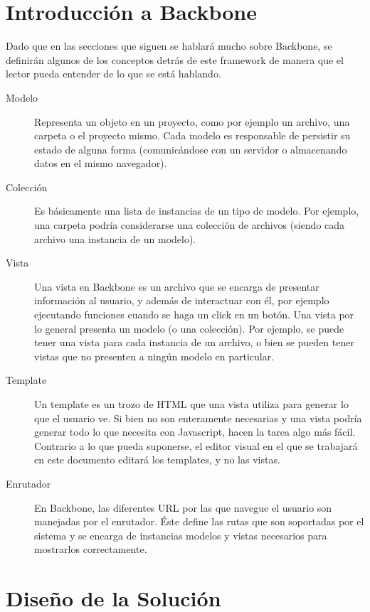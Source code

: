 \documentclass[12pt,spanish,letter]{report}
\begin{document}
\section{Introducción a Backbone}

\label{section:object-definition}

Dado que en las secciones que siguen se hablará mucho sobre Backbone, se
definirán algunos de los conceptos detrás de este framework de manera
que el lector pueda entender de lo que se está hablando.

\begin{description}
\item[Modelo]
Representa un objeto en un proyecto, como por ejemplo un archivo, una
carpeta o el proyecto mismo. Cada modelo es responsable de persistir su
estado de alguna forma (comunicándose con un servidor o almacenando
datos en el mismo navegador).
\item[Colección]
Es básicamente una lista de instancias de un tipo de modelo. Por
ejemplo, una carpeta podría considerarse una colección de archivos
(siendo cada archivo una instancia de un modelo).
\item[Vista]
Una vista en Backbone es un archivo que se encarga de presentar
información al usuario, y además de interactuar con él, por ejemplo
ejecutando funciones cuando se haga un click en un botón. Una vista por
lo general presenta un modelo (o una colección). Por ejemplo, se puede
tener una vista para cada instancia de un archivo, o bien se pueden
tener vistas que no presenten a ningún modelo en particular.
\item[Template]
Un template es un trozo de HTML que una vista utiliza para generar lo
que el usuario ve. Si bien no son enteramente necesarias y una vista
podría generar todo lo que necesita con Javascript, hacen la tarea algo
más fácil. Contrario a lo que pueda suponerse, el editor visual en el
que se trabajará en este documento editará los templates, y no las
vistas.
\item[Enrutador]
En Backbone, las diferentes URL por las que navegue el usuario son
manejadas por el enrutador. Éste define las rutas que son soportadas por
el sistema y se encarga de instancias modelos y vistas necesarios para
mostrarlos correctamente.
\end{description}

\section{Diseño de la Solución}
\end{document}
